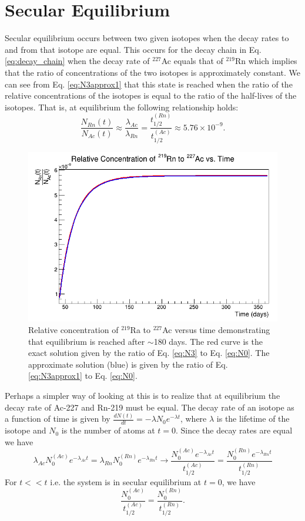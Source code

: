 \documentclass[11pt]{article}
\begin{document}
\section{Secular Equilibrium}
\label{S:2}
Secular equilibrium occurs between two given isotopes when the decay rates to and from that isotope are equal. This occurs for the decay chain in Eq. \ref{eq:decay_chain} when the decay rate of $^{227}$Ac equals that of $^{219}$Rn which implies that the ratio of concentrations of the two isotopes is approximately constant. We can see from Eq. \ref{eq:N3approx1} that this state is reached when the ratio of the relative concentrations of the isotopes is equal to the ratio of the half-lives of the isotopes. That is, at equilibrium the following relationship holds:
\[
\frac{N_{Rn}(t)}{N_{Ac}(t)}\approx \frac{\lambda_{Ac}}{\lambda_{Rn}}=\frac{t^{(Rn)}_{1/2}}{t^{(Ac)}_{1/2}}\approx5.76\times 10^{-9}.
\]
\begin{figure}[h]
\centering\includegraphics[width=0.8\linewidth]{RelRadonConcentrationvst}
\caption{Relative concentration of $^{219}$Ra to $^{227}$Ac versus time demonstrating that equilibrium is reached after $\sim$180 days. The red curve is the exact solution given by the ratio of Eq. \ref{eq:N3} to Eq. \ref{eq:N0}. The approximate solution (blue) is given by the ratio of Eq. \ref{eq:N3approx1} to Eq. \ref{eq:N0}.}
\end{figure}
Perhaps a simpler way of looking at this is to realize that at equilibrium the decay rate of Ac-227 and Rn-219 must be equal. The decay rate of an isotope as a function of time is given by $\frac{dN(t)}{dt}=-\lambda N_0e^{-\lambda t}$, where $\lambda$ is the lifetime of the isotope and $N_0$ is the number of atoms at $t=0$. Since the decay rates are equal we have
\begin{equation}
\lambda_{Ac}N_0^{(Ac)}e^{-\lambda_{Ac}t}=\lambda_{Rn}N_0^{(Rn)}e^{-\lambda_{Rn}t}\longrightarrow\frac{N_0^{(Ac)}e^{-\lambda_{Ac}t}}{t_{1/2}^{(Ac)}}=\frac{N_0^{(Rn)}e^{-\lambda_{Rn}t}}{t_{1/2}^{(Rn)}}
\end{equation}
For $t<<t$ i.e. the system is in secular equilibrium at $t=0$, we have
\[
\frac{N_0^{(Ac)}}{t_{1/2}^{(Ac)}}=\frac{N_0^{(Rn)}}{t_{1/2}^{(Rn)}}.
\]
\end{document}

